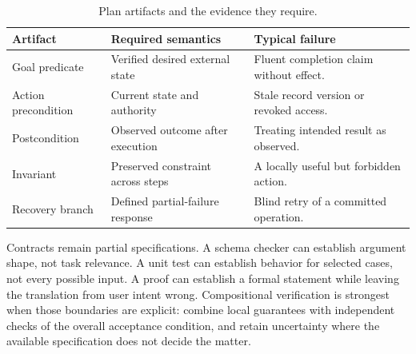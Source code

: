 {\small\setlength{\tabcolsep}{3pt}
\begin{table}[!htbp]
\centering
\caption{Plan artifacts and the evidence they require.}\label{tab:C10:contracts}
\begin{tabular}{L{28mm}L{38mm}L{40mm}}

\toprule Artifact & Required semantics & Typical failure\\\midrule
Goal predicate & Verified desired external state & Fluent completion claim without effect.\\
Action precondition & Current state and authority & Stale record version or revoked access.\\
Postcondition & Observed outcome after execution & Treating intended result as observed.\\
Invariant & Preserved constraint across steps & A locally useful but forbidden action.\\
Recovery branch & Defined partial-failure response & Blind retry of a committed operation.\\
\bottomrule
\end{tabular}
\end{table}
}

Contracts remain partial specifications. A schema checker can establish argument shape, not task relevance. A unit test can establish behavior for selected cases, not every possible input. A proof can establish a formal statement while leaving the translation from user intent wrong. Compositional verification is strongest when those boundaries are explicit: combine local guarantees with independent checks of the overall acceptance condition, and retain uncertainty where the available specification does not decide the matter.

